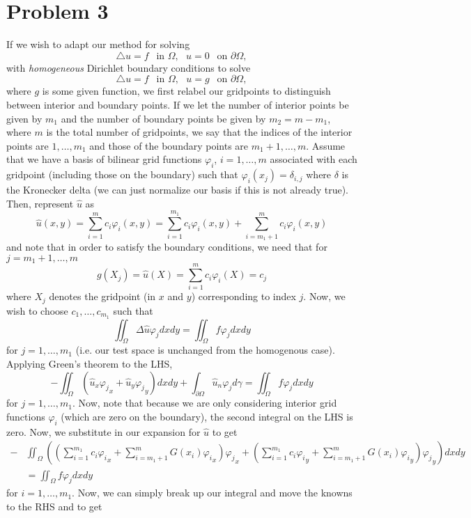 \documentclass{article}
\begin{document}
\section{Problem 3}
If we wish to adapt our method for solving \[
\bigtriangleup u = f~~\mbox{ in } \Omega ,~~~u = 0~~\mbox{ on } \partial \Omega ,
\]
with {\em homogeneous} Dirichlet boundary conditions to solve \[
\bigtriangleup u = f~~\mbox{ in } \Omega ,~~~u = g~~\mbox{ on } \partial \Omega ,
\]
where $g$ is some given function, we first relabel our gridpoints to distinguish between interior and boundary points. If we let the number of interior points be given by $m_1$ and the number of boundary points be given by $m_2=m-m_1$, where $m$ is the total number of gridpoints, we say that the indices of the interior points are $1,\ldots,m_1$ and those of the boundary points are $m_1+1,\ldots,m$. Assume that we have a basis of bilinear grid functions $\varphi_i$, $i=1,\ldots,m$ associated with each gridpoint (including those on the boundary) such that $\varphi_i(x_j)=\delta_{i,j}$ where $\delta$ is the Kronecker delta (we can just normalize our basis if this is not already true). Then, represent $\hat{u}$ as
\[
\hat{u}(x,y)=\sum_{i=1}^m c_i\varphi_i(x,y)=\sum_{i=1}^{m_1} c_i\varphi_i(x,y)+\sum_{i=m_1+1}^m c_i\varphi_i(x,y)
\]
and note that in order to satisfy the boundary conditions, we need that for $j=m_1+1,\ldots, m$
\[
g(X_j)=\hat{u}(X)=\sum_{i=1}^m c_i\varphi_i(X)=c_j
\]
where $X_j$ denotes the gridpoint (in $x$ and $y$) corresponding to index $j$. Now, we wish to choose $c_1,\ldots,c_{m_1}$ such that
\[
\iint_\Omega \Delta \hat{u}\varphi_jdxdy=\iint_\Omega f\varphi_jdxdy
\]
for $j=1,\ldots,m_1$ (i.e. our test space is unchanged from the homogenous case). Applying Green's theorem to the LHS, 
\[
-\iint_\Omega(\hat{u}_x{\varphi_j}_x+\hat{u}_y{\varphi_j}_y)dxdy+\int_{\partial\Omega}\hat{u}_n\varphi_jd\gamma=\iint_\Omega f\varphi_jdxdy
\]
for $j=1,\ldots,m_1$. Now, note that because we are only considering interior grid functions $\varphi_i$ (which are zero on the boundary), the second integral on the LHS is zero. Now, we substitute in our expansion for $\hat{u}$ to get 
\begin{align*}
-&\iint_\Omega\left(\left(\sum_{i=1}^{m_1} c_i{\varphi_i}_x+\sum_{i=m_1+1}^m G(x_i){\varphi_i}_x\right){\varphi_j}_x+\left(\sum_{i=1}^{m_1} c_i{\varphi_i}_y+\sum_{i=m_1+1}^m G(x_i){\varphi_i}_y\right){\varphi_j}_y\right)dxdy\\&=\iint_\Omega f\varphi_jdxdy
\end{align*}
for $i=1,\ldots,m_1$. Now, we can simply break up our integral and move the knowns to the RHS and to get
\end{document}
